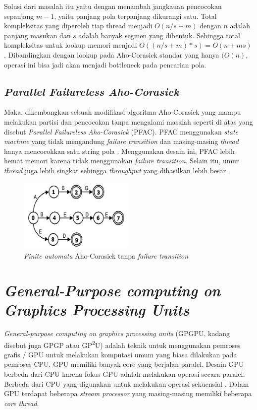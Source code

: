   Solusi dari masalah itu yaitu dengan menambah jangkauan pencocokan sepanjang $m - 1$, yaitu panjang pola terpanjang dikurangi satu. Total kompleksitas yang diperoleh tiap thread menjadi $O(n/s + m)$ dengan $n$ adalah panjang masukan dan $s$ adalah banyak segmen yang dibentuk. Sehingga total kompleksitas untuk lookup memori menjadi $O((n/s + m) * s) = O(n + ms)$. Dibandingkan dengan lookup pada Aho-Corasick standar yang hanya $(O(n)$, operasi ini bisa jadi akan menjadi bottleneck pada pencarian pola.

  \subsection {\emph{Parallel Failureless Aho-Corasick}}

    Maka, dikembangkan sebuah modifikasi algoritma Aho-Corasick yang mampu melakukan partisi dan pencocokan tanpa mengalami masalah seperti di atas yang disebut \emph{Parallel Failureless Aho-Corasick} (PFAC). PFAC menggunakan \emph{state machine} yang tidak mengandung \emph{failure transition} dan masing-masing \emph{thread} hanya mencocokkan satu string pola \citep{lin2013}. Menggunakan desain ini, PFAC lebih hemat memori karena tidak menggunakan \emph{failure transition}. Selain itu, umur \emph{thread} juga lebih singkat sehingga \emph{throughput} yang dihasilkan lebih besar.

    \begin{figure}[htb]
      \centering
      \includegraphics[width=0.5\textwidth]{resources/pfac.png}
      \caption[\emph{Finite automata} Aho-Corasick tanpa \emph{failure transition}]{\emph{Finite automata} Aho-Corasick tanpa \emph{failure transition} \citep{lin2013}}
    \end{figure}

\section{\emph{General-Purpose computing on Graphics Processing Units}}

  \emph{General-purpose computing on graphics processing units} (GPGPU, kadang disebut juga GPGP atau GP\textsuperscript{2}U) adalah teknik untuk menggunakan pemroses grafis / GPU untuk melakukan komputasi umum yang biasa dilakukan pada pemroses CPU. GPU memiliki banyak core yang berjalan paralel. Desain GPU berbeda dari CPU karena fokus GPU adalah melakukan operasi secara paralel. Berbeda dari CPU yang digunakan untuk melakukan operasi sekuensial \citep{lindholm2001}. Dalam GPU terdapat beberapa \emph{stream processor} yang masing-masing memiliki beberapa \emph{core thread}.

